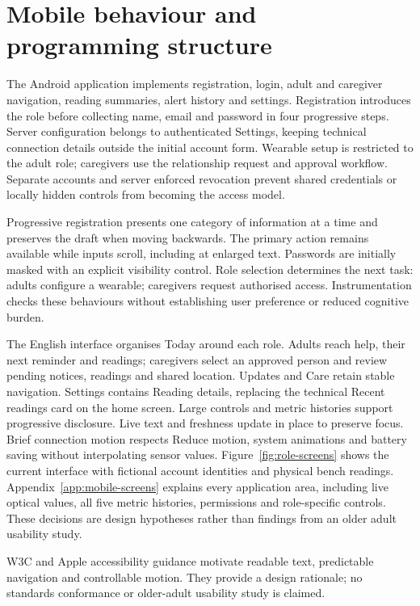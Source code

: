 \section{Mobile behaviour and programming structure}
\label{sec:mobile}
\begin{reportprose}
The Android application implements registration, login, adult and caregiver navigation, reading summaries, alert history and settings. Registration introduces the role before collecting name, email and password in four progressive steps. Server configuration belongs to authenticated Settings, keeping technical connection details outside the initial account form. Wearable setup is restricted to the adult role; caregivers use the relationship request and approval workflow. Separate accounts and server enforced revocation prevent shared credentials or locally hidden controls from becoming the access model.

Progressive registration presents one category of information at a time and preserves the draft when moving backwards. The primary action remains available while inputs scroll, including at enlarged text. Passwords are initially masked with an explicit visibility control. Role selection determines the next task: adults configure a wearable; caregivers request authorised access. Instrumentation checks these behaviours without establishing user preference or reduced cognitive burden.

The English interface organises Today around each role. Adults reach help, their next reminder and readings; caregivers select an approved person and review pending notices, readings and shared location. Updates and Care retain stable navigation. Settings contains Reading details, replacing the technical Recent readings card on the home screen. Large controls and metric histories support progressive disclosure. Live text and freshness update in place to preserve focus. Brief connection motion respects Reduce motion, system animations and battery saving without interpolating sensor values. Figure~\ref{fig:role-screens} shows the current interface with fictional account identities and physical bench readings. Appendix~\ref{app:mobile-screens} explains every application area, including live optical values, all five metric histories, permissions and role-specific controls. These decisions are design hypotheses rather than findings from an older adult usability study.\cite{accessibility,validation,currentrevision}

W3C and Apple accessibility guidance motivate readable text, predictable navigation and controllable motion. They provide a design rationale; no standards conformance or older-adult usability study is claimed.\cite{olderusers,appleaccessibility}


\end{reportprose}
